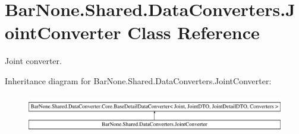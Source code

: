 \hypertarget{class_bar_none_1_1_shared_1_1_data_converters_1_1_joint_converter}{}\section{Bar\+None.\+Shared.\+Data\+Converters.\+Joint\+Converter Class Reference}
\label{class_bar_none_1_1_shared_1_1_data_converters_1_1_joint_converter}


Joint converter.  


Inheritance diagram for Bar\+None.\+Shared.\+Data\+Converters.\+Joint\+Converter\+:\begin{figure}[H]
\begin{center}
\leavevmode
\includegraphics[height=1.696970cm]{class_bar_none_1_1_shared_1_1_data_converters_1_1_joint_converter}
\end{center}
\end{figure}
